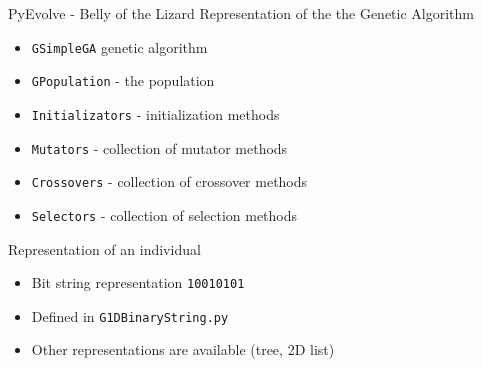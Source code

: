 \begin{frame}{PyEvolve - Belly of the Lizard}
	Representation of the the Genetic Algorithm
  \begin{itemize}
    \item \texttt{GSimpleGA} genetic algorithm
    \item \texttt{GPopulation} - the population
    \item \texttt{Initializators} - initialization methods
    \item \texttt{Mutators} - collection of mutator methods
    \item \texttt{Crossovers} - collection of crossover methods
    \item \texttt{Selectors} - collection of selection methods
  \end{itemize}
  Representation of an individual
  \begin{itemize}
    \item Bit string representation \texttt{10010101}
    \item Defined in \texttt{G1DBinaryString.py}
		\item Other representations are available (tree, 2D list)
  \end{itemize}
\end{frame}
